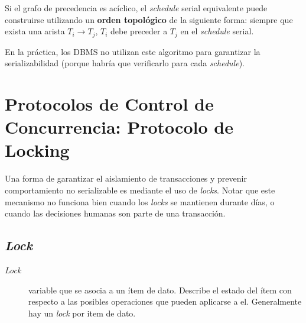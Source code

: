 \documentclass[a4paper, twoside]{article}
\begin{document}
Si el grafo de precedencia es acíclico, el \emph{schedule} serial equivalente puede construirse utilizando un \textbf{orden topológico} de la siguiente forma: siempre que exista una arista $T_{i}\to T_{j}$, $T_{i}$ debe preceder a $T_{j}$ en el \emph{schedule }serial.

En la práctica, los DBMS no utilizan este algoritmo para garantizar la serializabilidad (porque habría que verificarlo para cada \emph{schedule}).

\section{Protocolos de Control de Concurrencia: Protocolo de Locking}

Una forma de garantizar el aislamiento de transacciones y prevenir comportamiento no serializable es mediante el uso de \emph{locks}. Notar que este mecanismo no funciona bien cuando los \emph{locks} se mantienen durante días, o cuando las decisiones humanas son parte de una transacción.

\subsection{\emph{Lock}}
\begin{description}
	\item[\emph{Lock}] variable que se asocia a un ítem de dato. Describe el estado del ítem con respecto a las posibles operaciones que pueden aplicarse a el. Generalmente hay un \emph{lock} por item de dato.
\end{description}
\end{document}
